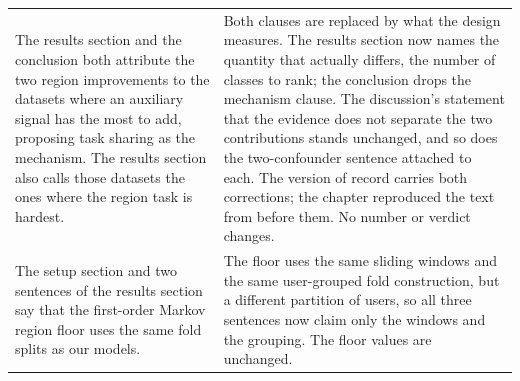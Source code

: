 \begin{table}[htb]
\begin{tabular}{@{}p{}p{}@{}}
%
%
The results section and the conclusion both attribute the two
region improvements to the datasets where an auxiliary signal
has the most to add, proposing task sharing as the mechanism.
The results section also calls those datasets the ones where
the region task is hardest. &
Both clauses are replaced by what the design measures. The
results section now names the quantity that actually differs,
the number of classes to rank; the conclusion drops the
mechanism clause. The discussion's statement that the evidence
does not separate the two contributions stands unchanged, and
so does the two-confounder sentence attached to each. The
version of record carries both corrections; the chapter
reproduced the text from before them. No number or verdict
changes. \\
\addlinespace
The setup section and two sentences of the results section say
that the first-order Markov region floor uses the same fold
splits as our models. &
The floor uses the same sliding windows and the same
user-grouped fold construction, but a different partition of
users, so all three sentences now claim only the windows and the
grouping. The floor values are unchanged. \\

\end{tabular}
\end{table}
